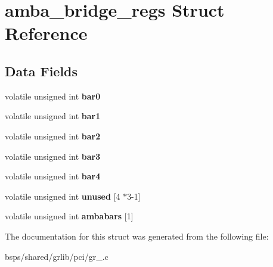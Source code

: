 \hypertarget{structamba__bridge__regs}{}\section{amba\+\_\+bridge\+\_\+regs Struct Reference}
\label{structamba__bridge__regs}
\subsection*{Data Fields}
\begin{DoxyCompactItemize}
\item 
\mbox{\label{structamba__bridge__regs_a1186d5b3bc85950908eb065ab32082f0}} 
volatile unsigned int {\bfseries bar0}
\item 
\mbox{\label{structamba__bridge__regs_a7fb90e80b5ed2b880a269e4093d5fd58}} 
volatile unsigned int {\bfseries bar1}
\item 
\mbox{\label{structamba__bridge__regs_abeb3e1ee2255d12501c3bf3981d1407c}} 
volatile unsigned int {\bfseries bar2}
\item 
\mbox{\label{structamba__bridge__regs_abda0e12a5cd093d996ecf4b7ef9f79a7}} 
volatile unsigned int {\bfseries bar3}
\item 
\mbox{\label{structamba__bridge__regs_adfaf2ba3ac7d78230242d1369ef2391d}} 
volatile unsigned int {\bfseries bar4}
\item 
\mbox{\label{structamba__bridge__regs_ab4b449f0a38f5330fa46783977ec2239}} 
volatile unsigned int {\bfseries unused} \mbox{[}4 $\ast$3-\/1\mbox{]}
\item 
\mbox{\label{structamba__bridge__regs_ab313a76a0467ded2f3c1635de891fd72}} 
volatile unsigned int {\bfseries ambabars} \mbox{[}1\mbox{]}
\end{DoxyCompactItemize}


The documentation for this struct was generated from the following file\+:\begin{DoxyCompactItemize}
\item 
bsps/shared/grlib/pci/gr\+\_.\+c\end{DoxyCompactItemize}
